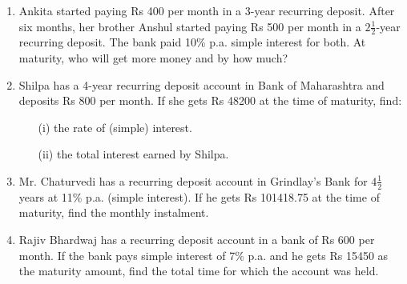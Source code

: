 \documentclass[12pt]{article}
\begin{document}
\begin{multicols}{2}
\begin{enumerate}[label=(\alph*)]
			\item Ankita started paying Rs 400 per month in a 3-year recurring deposit. After six months, her brother Anshul started paying Rs 500 per month in a \( 2\frac{1}{2} \)-year recurring deposit. The bank paid 10\% p.a. simple interest for both. At maturity, who will get more money and by how much?
			
			\item Shilpa has a 4-year recurring deposit account in Bank of Maharashtra and deposits Rs 800 per month. If she gets Rs 48200 at the time of maturity, find:
			\begin{enumerate}
				\item[(i)] the rate of (simple) interest.
				\item[(ii)] the total interest earned by Shilpa.
			\end{enumerate}
			
			\item Mr. Chaturvedi has a recurring deposit account in Grindlay's Bank for \( 4\frac{1}{2} \) years at 11\% p.a. (simple interest). If he gets Rs 101418.75 at the time of maturity, find the monthly instalment.
			
			\item Rajiv Bhardwaj has a recurring deposit account in a bank of Rs 600 per month. If the bank pays simple interest of 7\% p.a. and he gets Rs 15450 as the maturity amount, find the total time for which the account was held.
		\end{enumerate}
	\end{multicols}
	
	\center{******************}
	
\end{document}
